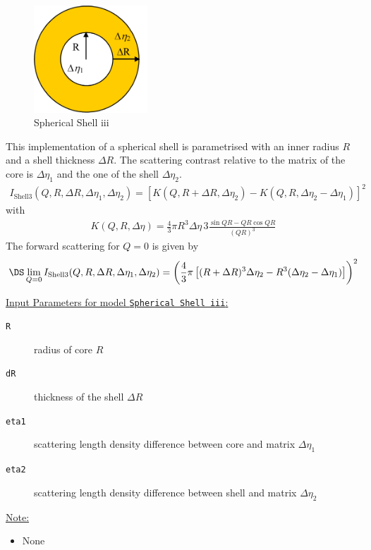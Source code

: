 \begin{figure}[htb]
\begin{center}
\includegraphics[width=0.38\textwidth]{../images/form_factor/spheres/shell3.png}
\end{center}
\caption{Spherical Shell iii} \label{fig:shell3}
\end{figure}
This implementation of a spherical shell is parametrised with an inner radius $R$ and a shell
thickness $\Delta R$. The scattering contrast relative to the matrix of the core is $ \Delta \eta_1$
and the one of the shell $\Delta\eta_2$.
\begin{align}
I_\text{Shell3}(Q,R,\Delta R,\Delta\eta_1,\Delta\eta_2)=
\left[K(Q,R+\Delta
R,\Delta\eta_2)-K(Q,R,\Delta\eta_2-\Delta\eta_1)\right]^2
\end{align}
with
\begin{align}
 K(Q,R,\Delta\eta) = \frac{4}{3}\pi R^3 \Delta\eta \, 3 \frac{\sin QR - QR \cos QR}{(QR)^3}
\end{align}
The forward scattering for $Q=0$ is given by
$$
\DS \lim_{Q=0}I_\text{Shell3}(Q,R,\Delta R,\Delta\eta_1,\Delta\eta_2)
= \left(\frac{4}{3}\pi \left[(R+\Delta R)^3\Delta\eta_2
                            - R^3(\Delta\eta_2-\Delta\eta_1)\right]\right)^2
$$

\vspace{5mm}
\noindent  \uline{Input Parameters for model \texttt{Spherical Shell iii}:}
\begin{description}
\item[\texttt{R}] radius of core $R$
\item[\texttt{dR}] thickness of the shell $\Delta R$
\item[\texttt{eta1}] scattering length density difference between core and matrix $\Delta\eta_1$
\item[\texttt{eta2}] scattering length density difference between shell and matrix $\Delta\eta_2$
\end{description}

\noindent\uline{Note:}
\begin{itemize}
\item[~] None
\end{itemize}


